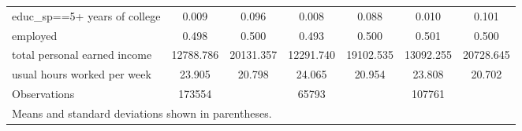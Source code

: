 \begin{table}[htbp]
\begin{tabular}{l*{3}{cc}}
educ\_sp==5+ years of college&       0.009&       0.096&       0.008&       0.088&       0.010&       0.101\\
employed            &       0.498&       0.500&       0.493&       0.500&       0.501&       0.500\\
total personal earned income&   12788.786&   20131.357&   12291.740&   19102.535&   13092.255&   20728.645\\
usual hours worked per week&      23.905&      20.798&      24.065&      20.954&      23.808&      20.702\\
\hline
Observations        &      173554&            &       65793&            &      107761&            \\
\hline\hline
\multicolumn{7}{l}{\footnotesize Means and standard deviations shown in parentheses.}\\
\end{tabular}
\end{table}
